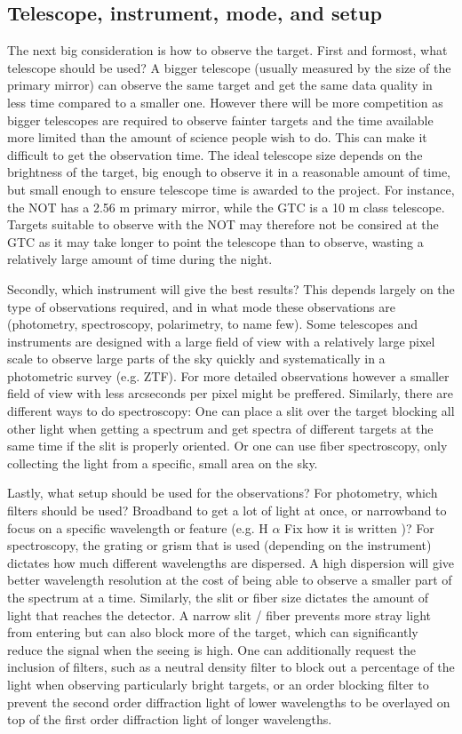 \documentclass[a4paper,oneside,12pt, class=Latex/Classes/PhDthesisPSnPDF, crop=false]{standalone}
\begin{document}
\subsection{Telescope, instrument, mode, and setup}
The next big consideration is how to observe the target. First and formost, what telescope should be used? A bigger telescope (usually measured by the size of the primary mirror) can observe the same target and get the same data quality in less time compared to a smaller one. However there will be more competition as bigger telescopes are required to observe fainter targets and the time available more limited than the amount of science people wish to do. This can make it difficult to get the observation time. The ideal telescope size depends on the brightness of the target, big enough to observe it in a reasonable amount of time, but small enough to ensure telescope time is awarded to the project. For instance, the NOT has a 2.56 m primary mirror, while the GTC is a 10 m class telescope. Targets suitable to observe with the NOT may therefore not be consired at the GTC as it may take longer to point the telescope than to observe, wasting a relatively large amount of time during the night.

Secondly, which instrument will give the best results? This depends largely on the type of observations required, and in what mode these observations are (photometry, spectroscopy, polarimetry, to name few). Some telescopes and instruments are designed with a large field of view with a relatively large pixel scale to observe large parts of the sky quickly and systematically in a photometric survey (e.g. ZTF). For more detailed observations however a smaller field of view with less arcseconds per pixel might be preffered. Similarly, there are different ways to do spectroscopy: One can place a slit over the target blocking all other light when getting a spectrum and get spectra of different targets at the same time if the slit is properly oriented. Or one can use fiber spectroscopy, only collecting the light from a specific, small area on the sky. 

Lastly, what setup should be used for the observations? For photometry, which filters should be used? Broadband to get a lot of light at once, or narrowband to focus on a specific wavelength or feature (e.g. H $\alpha$ \color{red}Fix how it is written \color{black})? For spectroscopy, the grating or grism that is used (depending on the instrument) dictates how much different wavelengths are dispersed. A high dispersion will give better wavelength resolution at the cost of being able to observe a smaller part of the spectrum at a time. Similarly, the slit or fiber size dictates the amount of light that reaches the detector. A narrow slit / fiber prevents more stray light from entering but can also block more of the target, which can significantly reduce the signal when the seeing is high. One can additionally request the inclusion of filters, such as a neutral density filter to block out a percentage of the light when observing particularly bright targets, or an order blocking filter to prevent the second order diffraction light of lower wavelengths to be overlayed on top of the first order diffraction light of longer wavelengths.
\end{document}
